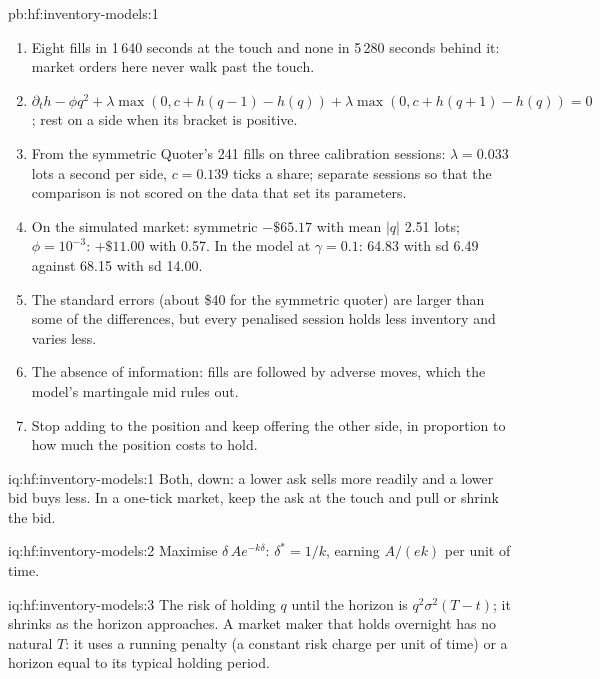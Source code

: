 \begin{solution}{pb:hf:inventory-models:1}
\begin{enumerate}
\item Eight fills in 1\,640 seconds at the touch and none in 5\,280 seconds behind it: market orders here never walk past the touch.
\item $\partial_th-\phi q^2+\lambda\max(0,c+h(q-1)-h(q))+\lambda\max(0,c+h(q+1)-h(q))=0$; rest on a side when its bracket is positive.
\item From the symmetric Quoter's 241 fills on three calibration sessions: $\lambda=0.033$ lots a second per side, $c=0.139$ ticks a share; separate
sessions so that the comparison is not scored on the data that set its parameters.
\item On the simulated market: symmetric $-\$65.17$ with mean $|q|$ 2.51 lots; $\phi=10^{-3}$: $+\$11.00$ with 0.57. In the model at $\gamma=0.1$:
64.83 with sd 6.49 against 68.15 with sd 14.00.
\item The standard errors (about \$40 for the symmetric quoter) are larger than some of the differences, but every penalised session holds less
inventory and varies less.
\item The absence of information: fills are followed by adverse moves, which the model's martingale mid rules out.
\item Stop adding to the position and keep offering the other side, in proportion to how much the position costs to hold.
\end{enumerate}
\end{solution}

\begin{solution}{iq:hf:inventory-models:1}
Both, down: a lower ask sells more readily and a lower bid buys less. In a one-tick market, keep the ask at the touch and pull or shrink the bid.
\end{solution}

\begin{solution}{iq:hf:inventory-models:2}
Maximise $\delta\,Ae^{-k\delta}$: $\delta^\ast=1/k$, earning $A/(ek)$ per unit of time.
\end{solution}

\begin{solution}{iq:hf:inventory-models:3}
The risk of holding $q$ until the horizon is $q^2\sigma^2(T-t)$; it shrinks as the horizon approaches. A market maker that holds overnight has no
natural $T$: it uses a running penalty (a constant risk charge per unit of time) or a horizon equal to its typical holding period.
\end{solution}

